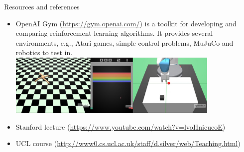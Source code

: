 \documentclass{beamer}
\begin{document}
\begin{frame}{Resources and references}
  \begin{itemize}
  \item OpenAI Gym (\url{https://gym.openai.com/}) is a toolkit for developing and comparing reinforcement learning algorithms. It provides several environments, e.g., Atari games, simple control problems, MuJuCo and robotics to test in.
  \includegraphics[width=0.8\textwidth]{gym.jpg}
  \item Stanford lecture (\url{https://www.youtube.com/watch?v=lvoHnicueoE})
  \item UCL course (\url{http://www0.cs.ucl.ac.uk/staff/d.silver/web/Teaching.html})
  \end{itemize}
\end{frame}
\end{document}
